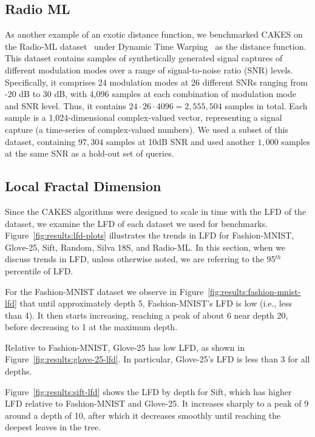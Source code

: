 \subsection{Radio ML}
\label{sec:datasets-and-benchmarks:radio-ml}

As another example of an exotic distance function, we benchmarked CAKES on the Radio-ML dataset~\cite{oshea2018radioml} under Dynamic Time Warping~\cite{muller2007dynamic} as the distance function.
This dataset contains samples of synthetically generated signal captures of different modulation modes over a range of signal-to-noise ratio (SNR) levels.
Specifically, it comprises 24 modulation modes at 26 different SNRs ranging from -20 dB to 30 dB, with 4,096 samples at each combination of modulation mode and SNR level.
Thus, it contains $24 \cdot 26 \cdot 4096 = 2,555,504$ samples in total.
Each sample is a 1,024-dimensional complex-valued vector, representing a signal capture (a time-series of complex-valued numbers).
We used a subset of this dataset, containing $97,304$ samples at 10dB SNR and used another $1,000$ samples at the same SNR as a hold-out set of queries.

\subsection{Local Fractal Dimension}
\label{sec:dayasets:lfd-of-datasets}

Since the CAKES algorithms were designed to scale in time with the LFD of the dataset, we examine the LFD of each dataset we used for benchmarks.
Figure~\ref{fig:results:lfd-plots} illustrates the trends in LFD for Fashion-MNIST, Glove-25, Sift, Random, Silva 18S, and Radio-ML.
In this section, when we discuss trends in LFD, unless otherwise noted, we are referring to the 95$^{th}$ percentile of LFD.

For the Fashion-MNIST dataset we observe in Figure~\ref{fig:results:fashion-mnist-lfd} that until approximately depth 5, Fashion-MNIST's LFD is low (i.e., less than 4).
It then starts increasing, reaching a peak of about 6 near depth 20, before decreasing to 1 at the maximum depth.

Relative to Fashion-MNIST, Glove-25 has low LFD, as shown in Figure~\ref{fig:results:glove-25-lfd}.
In particular, Glove-25's LFD is less than 3 for all depths.

Figure~\ref{fig:results:sift-lfd} shows the LFD by depth for Sift, which has higher LFD relative to Fashion-MNIST and Glove-25.
It increases sharply to a peak of 9 around a depth of 10, after which it decreases smoothly until reaching the deepest leaves in the tree.

